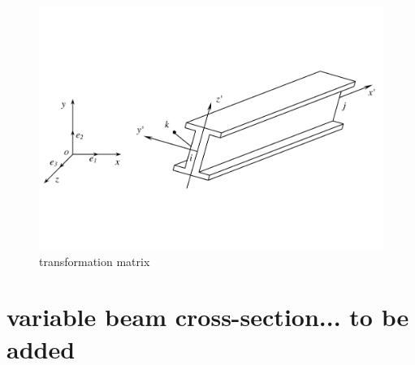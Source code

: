 \begin{figure}[h!]
\centering
\includegraphics[width=0.5\linewidth]{figure/transformation_for_beam}
\caption{transformation matrix}
\label{fig:transformationforbeam}
\end{figure}

\section{variable beam cross-section... to be added}